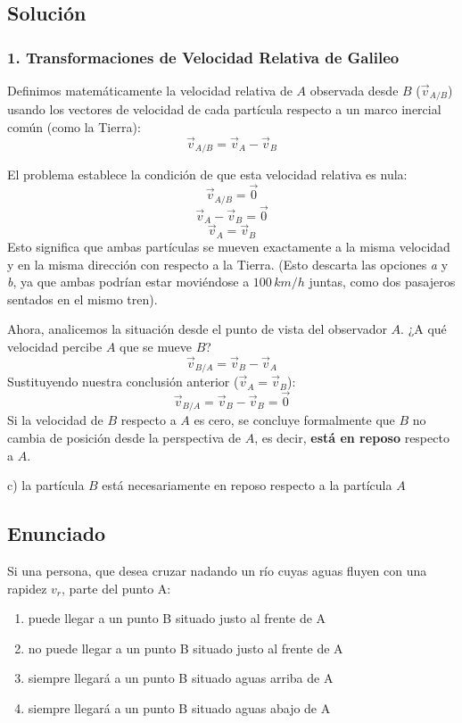 \documentclass[12pt, a4paper]{article}
\begin{document}
\subsection*{Solución}

\subsubsection*{1. Transformaciones de Velocidad Relativa de Galileo}
Definimos matemáticamente la velocidad relativa de $A$ observada desde $B$ ($\vec{v}_{A/B}$) usando los vectores de velocidad de cada partícula respecto a un marco inercial común (como la Tierra):
$$ \vec{v}_{A/B} = \vec{v}_A - \vec{v}_B $$

El problema establece la condición de que esta velocidad relativa es nula:
$$ \vec{v}_{A/B} = \vec{0} $$
$$ \vec{v}_A - \vec{v}_B = \vec{0} $$
$$ \vec{v}_A = \vec{v}_B $$
Esto significa que ambas partículas se mueven exactamente a la misma velocidad y en la misma dirección con respecto a la Tierra. (Esto descarta las opciones \textit{a} y \textit{b}, ya que ambas podrían estar moviéndose a $100\,\si{km/h}$ juntas, como dos pasajeros sentados en el mismo tren).

Ahora, analicemos la situación desde el punto de vista del observador $A$. ¿A qué velocidad percibe $A$ que se mueve $B$?
$$ \vec{v}_{B/A} = \vec{v}_B - \vec{v}_A $$
Sustituyendo nuestra conclusión anterior ($\vec{v}_A = \vec{v}_B$):
$$ \vec{v}_{B/A} = \vec{v}_B - \vec{v}_B = \vec{0} $$
Si la velocidad de $B$ respecto a $A$ es cero, se concluye formalmente que $B$ no cambia de posición desde la perspectiva de $A$, es decir, \textbf{está en reposo} respecto a $A$.

\begin{tcolorbox}[colback=green!5!white, colframe=green!50!black, title=Respuesta Final]
\centering \Large c) la partícula $B$ está necesariamente en reposo respecto a la partícula $A$
\end{tcolorbox}

\newpage

\subsection*{Enunciado}
Si una persona, que desea cruzar nadando un río cuyas aguas fluyen con una rapidez $v_r$, parte del punto A:
\begin{enumerate}[label=\alph*)]
    \item puede llegar a un punto B situado justo al frente de A
    \item no puede llegar a un punto B situado justo al frente de A
    \item siempre llegará a un punto B situado aguas arriba de A
    \item siempre llegará a un punto B situado aguas abajo de A
\end{enumerate}
\end{document}
